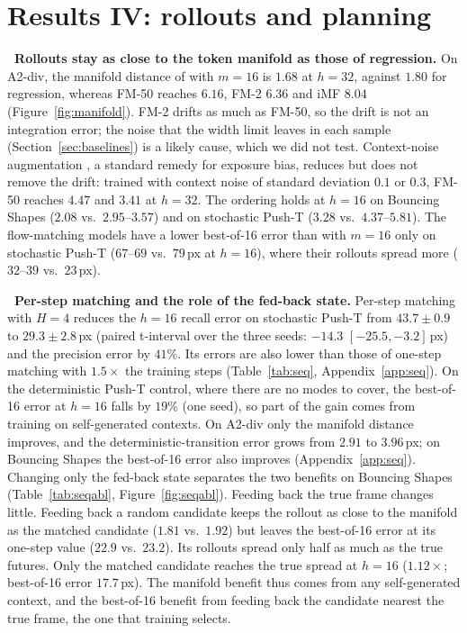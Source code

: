 \section{Results IV: rollouts and planning}
\label{sec:results4}


\leavevmode{}\textbf{\thesubsection\ Rollouts stay as close to the token manifold as those of regression.}
\label{sec:manifold}
On A2-div, the manifold distance of \imlewm{} with $m{=}16$ is $1.68$ at $h{=}32$, against $1.80$ for regression, whereas FM-50 reaches $6.16$, FM-2 $6.36$ and iMF $8.04$ (Figure~\ref{fig:manifold}). FM-2 drifts as much as FM-50, so the drift is not an integration error; the noise that the width limit leaves in each sample (Section~\ref{sec:baselines}) is a likely cause, which we did not test. Context-noise augmentation \citep{valevski2025gamengen,chen2024diffusionforcing}, a standard remedy for exposure bias, reduces but does not remove the drift: trained with context noise of standard deviation $0.1$ or $0.3$, FM-50 reaches $4.47$ and $3.41$ at $h{=}32$. The ordering holds at $h{=}16$ on Bouncing Shapes ($2.08$ vs.\ $2.95$--$3.57$) and on stochastic Push-T ($3.28$ vs.\ $4.37$--$5.81$). The flow-matching models have a lower best-of-16 error than \imlewm{} with $m{=}16$ only on stochastic Push-T ($67$--$69$ vs.\ $79$\,px at $h{=}16$), where their rollouts spread more ($32$--$39$ vs.\ $23$\,px).


\leavevmode{}\textbf{\thesubsection\ Per-step matching and the role of the fed-back state.}
\label{sec:seq}
Per-step matching with $H{=}4$ reduces the $h{=}16$ recall error on stochastic Push-T from $43.7 \pm 0.9$ to $29.3 \pm 2.8$\,px (paired t-interval over the three seeds: $-14.3$ $[-25.5, -3.2]$\,px) and the precision error by $41\%$. Its errors are also lower than those of one-step matching with $1.5\times$ the training steps (Table~\ref{tab:seq}, Appendix~\ref{app:seq}). On the deterministic Push-T control, where there are no modes to cover, the best-of-16 error at $h{=}16$ falls by $19\%$ (one seed), so part of the gain comes from training on self-generated contexts. On A2-div only the manifold distance improves, and the deterministic-transition error grows from $2.91$ to $3.96$\,px; on Bouncing Shapes the best-of-16 error also improves (Appendix~\ref{app:seq}). Changing only the fed-back state separates the two benefits on Bouncing Shapes (Table~\ref{tab:seqabl}, Figure~\ref{fig:seqabl}). Feeding back the true frame changes little. Feeding back a random candidate keeps the rollout as close to the manifold as the matched candidate ($1.81$ vs.\ $1.92$) but leaves the best-of-16 error at its one-step value ($22.9$ vs.\ $23.2$). Its rollouts spread only half as much as the true futures. Only the matched candidate reaches the true spread at $h{=}16$ ($1.12\times$; best-of-16 error $17.7$\,px). The manifold benefit thus comes from any self-generated context, and the best-of-16 benefit from feeding back the candidate nearest the true frame, the one that \nom{} training selects.


